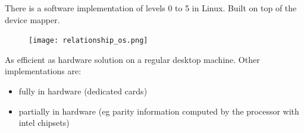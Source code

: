 There is a software implementation of levels 0 to 5 in Linux.
Built on top of the device mapper.

\begin{figure}[h!]
  \begin{center}
    \texttt{[image: relationship\_os.png]}
    \caption{}
  \end{center}
\end{figure}

As efficient as hardware solution on a regular desktop machine.
Other implementations are:

\begin{itemize}
  \item fully in hardware (dedicated cards)
  \item partially in hardware (eg parity information computed by the processor with intel chipsets)
\end{itemize}



